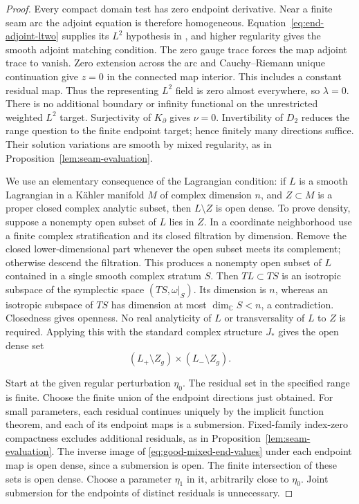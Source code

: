 \documentclass[11pt]{amsart}
\theoremstyle{definition}
\theoremstyle{remark}
\theoremstyle{plain}
\newcommand{\CC}{\mathbb{C}}
\begin{document}
\begin{proof}
Every compact domain test has zero endpoint derivative. Near a
finite seam arc the adjoint equation is therefore homogeneous.
Equation~\eqref{eq:end-adjoint-ltwo} supplies its $L^2$ hypothesis
in \cite[Theorem~5.9(ii)]{DaeFukLip21b}, and higher regularity
gives the smooth adjoint matching condition. The zero gauge trace
forces the map adjoint trace to vanish. Zero extension across the
arc and Cauchy--Riemann unique continuation give $z=0$ in the
connected map interior. This includes a constant residual map.
Thus the representing $L^2$ field is zero almost everywhere,
so $\lambda=0$. There is no additional boundary or infinity
functional on the unrestricted weighted $L^2$ target.
Surjectivity of $K_\partial$ gives $\nu=0$.
Invertibility of $D_2$ reduces the range question to the finite
endpoint target; hence finitely many directions suffice.
Their solution variations are smooth by mixed regularity, as
in Proposition~\ref{lem:seam-evaluation}.

We use an elementary consequence of the Lagrangian condition:
if $L$ is a smooth Lagrangian in a K\"ahler manifold $M$ of
complex dimension $n$, and $Z\subset M$ is a proper closed
complex analytic subset, then $L\setminus Z$ is open dense.
To prove density, suppose a nonempty open subset of $L$ lies in
$Z$. In a coordinate neighborhood use a finite complex
stratification and its closed filtration by dimension.
Remove the closed lower-dimensional part whenever the open subset
meets its complement; otherwise descend the filtration.
This produces a nonempty open subset of $L$ contained in a
single smooth complex stratum $S$. Then $TL\subset TS$ is an
isotropic subspace of the symplectic space $(TS,\omega|_S)$.
Its dimension is $n$, whereas an isotropic subspace of $TS$
has dimension at most $\dim_\CC S<n$, a contradiction.
Closedness gives openness. No real analyticity of $L$ or
transversality of $L$ to $Z$ is required. Applying this with
the standard complex structure $J_*$ gives the open dense set
\begin{equation}\label{eq:good-mixed-end-values}
             (L_+\setminus Z_g)\times(L_-\setminus Z_g).
\end{equation}

Start at the given regular perturbation $\eta_0$. The residual
set in the specified range is finite. Choose the finite union
of the endpoint directions just obtained. For small parameters,
each residual continues uniquely by the implicit function
theorem, and each of its endpoint maps is a submersion.
Fixed-family index-zero compactness excludes additional
residuals, as in Proposition~\ref{lem:seam-evaluation}.
The inverse image of \eqref{eq:good-mixed-end-values} under
each endpoint map is open dense, since a submersion is open.
The finite intersection of these sets is open dense. Choose a
parameter $\eta_1$ in it, arbitrarily close to $\eta_0$.
Joint submersion for the endpoints of distinct residuals
is unnecessary.


\end{proof}
\end{document}
